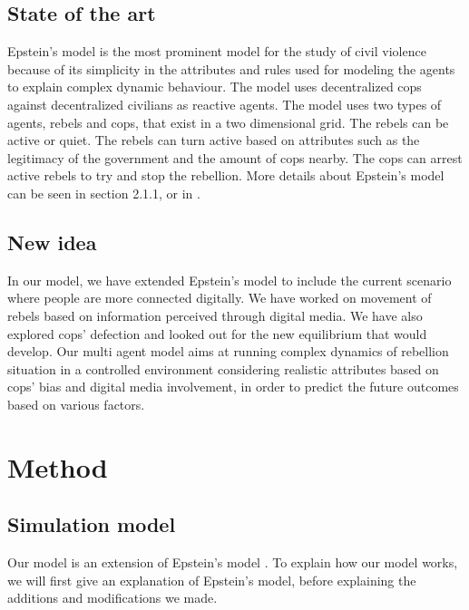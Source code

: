 \documentclass[a4paper,11pt]{article}
\begin{document}
\subsection{State of the art}
Epstein's model \cite{epstein2002modeling} is the most prominent model for the study of civil violence because of its simplicity in the attributes and rules used for modeling the agents to explain complex dynamic behaviour. The model uses decentralized cops against decentralized civilians as reactive agents. The model uses two types of agents,  rebels and cops, that exist in a two dimensional grid. The rebels can be active or quiet. The rebels can turn active based on attributes such as the legitimacy of the government and the amount of cops nearby. The cops can arrest active rebels to try and stop the rebellion. More details about Epstein's model can be seen in section 2.1.1, or in \cite{epstein2002modeling}. %
 
\subsection{New idea}

In our model, we have extended Epstein's model to include the current scenario where people are more connected digitally. We have worked on movement of rebels based on information perceived through digital media. We have also explored cops' defection and looked out for the new equilibrium that would develop. Our multi agent model aims at running complex dynamics of rebellion situation in a controlled environment considering realistic attributes based on cops' bias and digital media involvement, in order to predict the future outcomes based on various factors.

\section{Method}

\subsection{Simulation model}
Our model is an extension of Epstein's model \cite{epstein2002modeling}. To explain how our model works, we will first give an explanation of Epstein's model, before explaining the additions and modifications we made.
\end{document}
